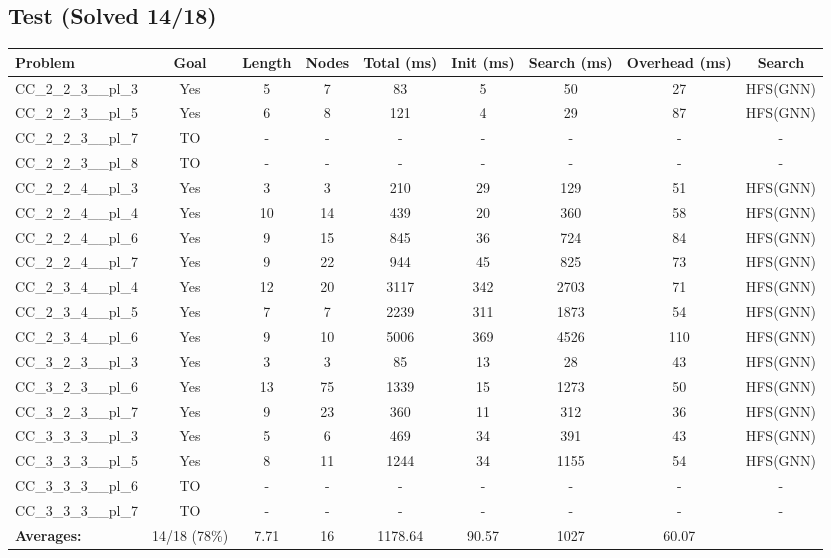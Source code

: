 \documentclass{article}
\begin{document}
\subsection*{Test (Solved 14/18)}
\begin{tabular}{lcccccccc}
\toprule
Problem & Goal & Length & Nodes & Total (ms) & Init (ms) & Search (ms) & Overhead (ms) & Search \\
\midrule
CC\_2\_2\_3\_\_pl\_3 & Yes & 5 & 7 & 83 & 5 & 50 & 27 & HFS(GNN) \\
CC\_2\_2\_3\_\_pl\_5 & Yes & 6 & 8 & 121 & 4 & 29 & 87 & HFS(GNN) \\
CC\_2\_2\_3\_\_pl\_7 & TO & - & - & - & - & - & - & - \\
CC\_2\_2\_3\_\_pl\_8 & TO & - & - & - & - & - & - & - \\
CC\_2\_2\_4\_\_pl\_3 & Yes & 3 & 3 & 210 & 29 & 129 & 51 & HFS(GNN) \\
CC\_2\_2\_4\_\_pl\_4 & Yes & 10 & 14 & 439 & 20 & 360 & 58 & HFS(GNN) \\
CC\_2\_2\_4\_\_pl\_6 & Yes & 9 & 15 & 845 & 36 & 724 & 84 & HFS(GNN) \\
CC\_2\_2\_4\_\_pl\_7 & Yes & 9 & 22 & 944 & 45 & 825 & 73 & HFS(GNN) \\
CC\_2\_3\_4\_\_pl\_4 & Yes & 12 & 20 & 3117 & 342 & 2703 & 71 & HFS(GNN) \\
CC\_2\_3\_4\_\_pl\_5 & Yes & 7 & 7 & 2239 & 311 & 1873 & 54 & HFS(GNN) \\
CC\_2\_3\_4\_\_pl\_6 & Yes & 9 & 10 & 5006 & 369 & 4526 & 110 & HFS(GNN) \\
CC\_3\_2\_3\_\_pl\_3 & Yes & 3 & 3 & 85 & 13 & 28 & 43 & HFS(GNN) \\
CC\_3\_2\_3\_\_pl\_6 & Yes & 13 & 75 & 1339 & 15 & 1273 & 50 & HFS(GNN) \\
CC\_3\_2\_3\_\_pl\_7 & Yes & 9 & 23 & 360 & 11 & 312 & 36 & HFS(GNN) \\
CC\_3\_3\_3\_\_pl\_3 & Yes & 5 & 6 & 469 & 34 & 391 & 43 & HFS(GNN) \\
CC\_3\_3\_3\_\_pl\_5 & Yes & 8 & 11 & 1244 & 34 & 1155 & 54 & HFS(GNN) \\
CC\_3\_3\_3\_\_pl\_6 & TO & - & - & - & - & - & - & - \\
CC\_3\_3\_3\_\_pl\_7 & TO & - & - & - & - & - & - & - \\
\textbf{Averages:} & 14/18 (78\%) & 7.71 & 16 & 1178.64 & 90.57 & 1027 & 60.07 & \\
\bottomrule
\end{tabular}
\\[0.7cm]
\end{document}
